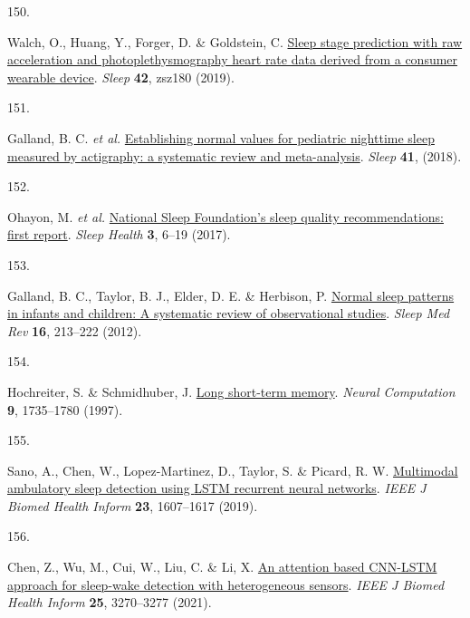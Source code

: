 \documentclass[
  10pt,
]{scrbook}
\newlength{\cslhangindent}
\newlength{\csllabelwidth}
\newlength{\cslentryspacingunit} %
\newenvironment{CSLReferences}[2] %
 {%
  \setlength{\parindent}{0pt}
  \ifodd #1
  \let\oldpar\par
  \def\par{\hangindent=\cslhangindent\oldpar}
  \fi
  \setlength{\parskip}{#2\cslentryspacingunit}
 }%
 {}
\newcommand{\CSLLeftMargin}[1]{\parbox[t]{\csllabelwidth}{#1}}
\newcommand{\CSLRightInline}[1]{\parbox[t]{\linewidth - \csllabelwidth}{#1}\break}
\let\originaltextbf\textbf
\renewcommand{\textbf}[1]{\textcolor{color1}{\textsf{\originaltextbf{#1}}}}
\begin{document}
\begin{CSLReferences}{0}{0}
\leavevmode{}%
\CSLLeftMargin{150. }%
\CSLRightInline{Walch, O., Huang, Y., Forger, D. \& Goldstein, C.
\href{https://doi.org/10.1093/sleep/zsz180}{Sleep stage prediction with
raw acceleration and photoplethysmography heart rate data derived from a
consumer wearable device}. \emph{Sleep} \textbf{42}, zsz180 (2019).}

\leavevmode{}%
\CSLLeftMargin{151. }%
\CSLRightInline{Galland, B. C. \emph{et al.}
\href{https://doi.org/10.1093/sleep/zsy017}{Establishing normal values
for pediatric nighttime sleep measured by actigraphy: a systematic
review and meta-analysis}. \emph{Sleep} \textbf{41}, (2018).}

\leavevmode{}%
\CSLLeftMargin{152. }%
\CSLRightInline{Ohayon, M. \emph{et al.}
\href{https://doi.org/10.1016/j.sleh.2016.11.006}{National Sleep
Foundation's sleep quality recommendations: first report}. \emph{Sleep
Health} \textbf{3}, 6--19 (2017).}

\leavevmode{}%
\CSLLeftMargin{153. }%
\CSLRightInline{Galland, B. C., Taylor, B. J., Elder, D. E. \& Herbison,
P. \href{https://doi.org/10.1016/j.smrv.2011.06.001}{Normal sleep
patterns in infants and children: A systematic review of observational
studies}. \emph{Sleep Med Rev} \textbf{16}, 213--222 (2012).}

\leavevmode{}%
\CSLLeftMargin{154. }%
\CSLRightInline{Hochreiter, S. \& Schmidhuber, J.
\href{https://doi.org/10.1162/neco.1997.9.8.1735}{Long short-term
memory}. \emph{Neural Computation} \textbf{9}, 1735--1780 (1997).}

\leavevmode{}%
\CSLLeftMargin{155. }%
\CSLRightInline{Sano, A., Chen, W., Lopez-Martinez, D., Taylor, S. \&
Picard, R. W.
\href{https://doi.org/10.1109/JBHI.2018.2867619}{Multimodal ambulatory
sleep detection using {LSTM} recurrent neural networks}. \emph{{IEEE} J
Biomed Health Inform} \textbf{23}, 1607--1617 (2019).}

\leavevmode{}%
\CSLLeftMargin{156. }%
\CSLRightInline{Chen, Z., Wu, M., Cui, W., Liu, C. \& Li, X.
\href{https://doi.org/10.1109/JBHI.2020.3006145}{An attention based
{CNN}-{LSTM} approach for sleep-wake detection with heterogeneous
sensors}. \emph{{IEEE} J Biomed Health Inform} \textbf{25}, 3270--3277
(2021).}


\end{CSLReferences}
\end{document}
